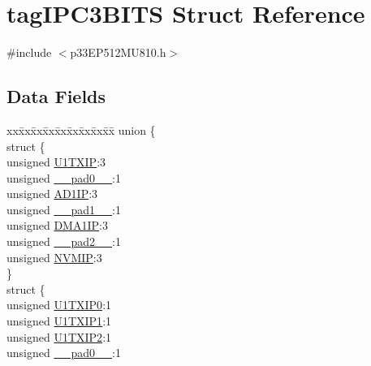 \hypertarget{structtag_i_p_c3_b_i_t_s}{}\section{tag\+I\+P\+C3\+B\+I\+TS Struct Reference}
\label{structtag_i_p_c3_b_i_t_s}


{\ttfamily \#include $<$p33\+E\+P512\+M\+U810.\+h$>$}

\subsection*{Data Fields}
\begin{DoxyCompactItemize}
\item 
\begin{tabbing}
xx\=xx\=xx\=xx\=xx\=xx\=xx\=xx\=xx\=\kill
union \{\\
\>struct \{\\
\>\>unsigned \hyperlink{structtag_i_p_c3_b_i_t_s_a51cf10f4ba7b0b26729d711cb6b33140}{U1TXIP}:3\\
\>\>unsigned \hyperlink{structtag_i_p_c3_b_i_t_s_adf71f3d8410c1f1dbbc96680a92c49af}{\_\_pad0\_\_}:1\\
\>\>unsigned \hyperlink{structtag_i_p_c3_b_i_t_s_a0e18920d51525279d1f539241844b389}{AD1IP}:3\\
\>\>unsigned \hyperlink{structtag_i_p_c3_b_i_t_s_acaf2d0924a107ec6e8d2e31febaf66f9}{\_\_pad1\_\_}:1\\
\>\>unsigned \hyperlink{structtag_i_p_c3_b_i_t_s_a3590121361e9b53a98dc5805bd1199a1}{DMA1IP}:3\\
\>\>unsigned \hyperlink{structtag_i_p_c3_b_i_t_s_a4d97cc5f7d51d22fc2bf3eab35c9cb7f}{\_\_pad2\_\_}:1\\
\>\>unsigned \hyperlink{structtag_i_p_c3_b_i_t_s_a8ce6e9dd847e0ca3f8795e1035a515a9}{NVMIP}:3\\
\>\} \\
\>struct \{\\
\>\>unsigned \hyperlink{structtag_i_p_c3_b_i_t_s_a24814bc109b9b9f1fd70de4d3472dc5b}{U1TXIP0}:1\\
\>\>unsigned \hyperlink{structtag_i_p_c3_b_i_t_s_a02206387a4a892f6551a2389adc7c286}{U1TXIP1}:1\\
\>\>unsigned \hyperlink{structtag_i_p_c3_b_i_t_s_ab29db95219cd6228fedadbc956a17e2b}{U1TXIP2}:1\\
\>\>unsigned \hyperlink{structtag_i_p_c3_b_i_t_s_adf71f3d8410c1f1dbbc96680a92c49af}{\_\_pad0\_\_}:1\\

\end{tabbing}
\end{DoxyCompactItemize}
